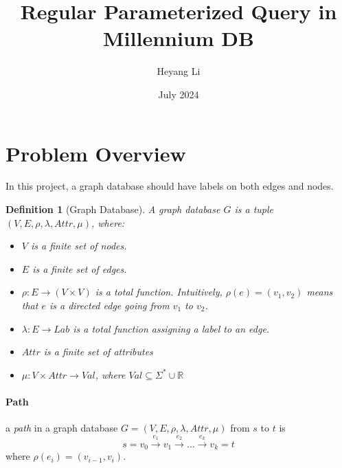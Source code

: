 \documentclass{article}
\title{Regular Parameterized Query in Millennium DB}
\author{Heyang Li}
\date{July 2024}
\newtheorem{definition}{Definition}
\begin{document}
\maketitle

\section*{Problem Overview}
 
In this project, a graph database should have labels on both edges and nodes. 
\begin{definition}[Graph Database]
    A graph database $G$ is a tuple $(V, E, \rho, \lambda, Attr, \mu)$, where:
\begin{itemize}
    \item $V$ is a finite set of nodes.
    \item $E$ is a finite set of edges. 
    \item $\rho: E \to (V \times V)$ is a total function. Intuitively, $\rho(e) = (v_1, v_2)$ means that $e$ is a directed edge going from $v_1$ to $v_2$.
    \item $\lambda: E \to Lab$ is a total function assigning a label to an edge.
    \item $Attr$ is a finite set of attributes 
    \item $\mu: V \times Attr \to Val$, where $Val \subseteq \Sigma^* \cup \mathbb{R}$ 
\end{itemize}
\end{definition}


\paragraph{Path} a \emph{path} in a graph database $G = (V, E, \rho, \lambda, Attr, \mu)$ from $s$ to $t$ is 
\[
s = v_0 \xrightarrow{e_1} v_1 \xrightarrow{e_2} \dots \xrightarrow{e_{k}} v_k = t
\]
where $\rho(e_i) = (v_{i-1}, v_i)$.
\end{document}
